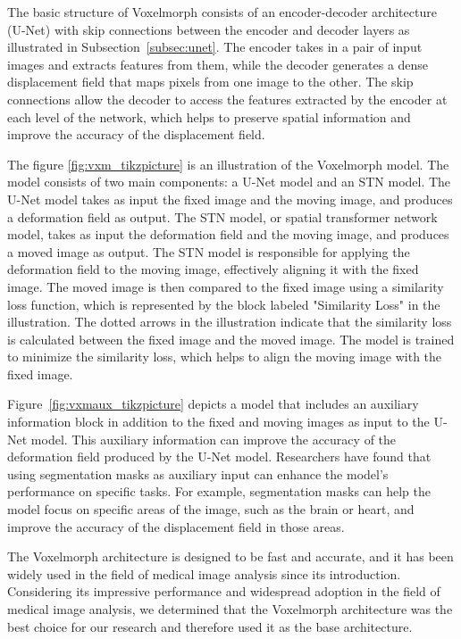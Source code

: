 \documentclass{book}
\begin{document}
	The basic structure of Voxelmorph consists of an encoder-decoder architecture (U-Net) with skip connections between the encoder and decoder layers as illustrated in Subsection~\ref{subsec:unet}. The encoder takes in a pair of input images and extracts features from them, while the decoder generates a dense displacement field that maps pixels from one image to the other. The skip connections allow the decoder to access the features extracted by the encoder at each level of the network, which helps to preserve spatial information and improve the accuracy of the displacement field.
	
	The figure \ref{fig:vxm_tikzpicture} is an illustration of the Voxelmorph model. The model consists of two main components: a U-Net model and an STN model. The U-Net model takes as input the fixed image and the moving image, and produces a deformation field as output. The STN model, or spatial transformer network model, takes as input the deformation field and the moving image, and produces a moved image as output. The STN model is responsible for applying the deformation field to the moving image, effectively aligning it with the fixed image. The moved image is then compared to the fixed image using a similarity loss function, which is represented by the block labeled "Similarity Loss" in the illustration. The dotted arrows in the illustration indicate that the similarity loss is calculated between the fixed image and the moved image. The model is trained to minimize the similarity loss, which helps to align the moving image with the fixed image.
	
	Figure~\ref{fig:vxmaux_tikzpicture} depicts a model that includes an auxiliary information block in addition to the fixed and moving images as input to the U-Net model. This auxiliary information can improve the accuracy of the deformation field produced by the U-Net model. Researchers have found that using segmentation masks as auxiliary input can enhance the model's performance on specific tasks. For example, segmentation masks can help the model focus on specific areas of the image, such as the brain or heart, and improve the accuracy of the displacement field in those areas.
	
	The Voxelmorph architecture is designed to be fast and accurate, and it has been widely used in the field of medical image analysis since its introduction. Considering its impressive performance and widespread adoption in the field of medical image analysis, we determined that the Voxelmorph architecture was the best choice for our research and therefore used it as the base architecture.
	
\end{document}
